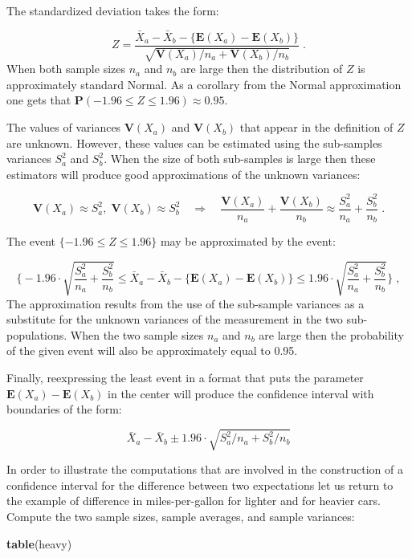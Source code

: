 \documentclass[
]{krantz}
\makeatletter
\newenvironment{Shaded}{\begin{snugshade}}{\end{snugshade}}
\newcommand{\KeywordTok}[1]{\textcolor[rgb]{0.13,0.29,0.53}{\textbf{#1}}}
\newcommand{\NormalTok}[1]{#1}
\newcommand{\Expec}{\mathbf{E}}
\newcommand{\Prob}{\mathbf{P}}
\newcommand{\Var}{\mathbf{V}}
\newenvironment{kframe}{%
\medskip{}
\setlength{\fboxsep}{.8em}
 \def\at@end@of@kframe{}%
 \ifinner\ifhmode%
  \def\at@end@of@kframe{\end{minipage}}%
  \begin{minipage}{\columnwidth}%
 \fi\fi%
 \def\FrameCommand##1{\hskip\@totalleftmargin \hskip-\fboxsep
 \colorbox{shadecolor}{##1}\hskip-\fboxsep
     \hskip-\linewidth \hskip-\@totalleftmargin \hskip\columnwidth}%
 \MakeFramed {\advance\hsize-\width
   \@totalleftmargin\z@ \linewidth\hsize
   \@setminipage}}%
 {\par\unskip\endMakeFramed%
 \at@end@of@kframe}
\renewenvironment{Shaded}{\begin{kframe}}{\end{kframe}}
\theoremstyle{definition}
\theoremstyle{definition}
\theoremstyle{definition}
\theoremstyle{remark}
\makeatother
\begin{document}
The standardized deviation takes the form:

\[Z = \frac{\bar X_a- \bar X_b - \{\Expec(X_a)- \Expec(X_b)\}}{\sqrt{\Var(X_a)/n_a +\Var(X_b)/n_b}}\;.\]
When both sample sizes \(n_a\) and \(n_b\) are large then the distribution
of \(Z\) is approximately standard Normal. As a corollary from the Normal
approximation one gets that
\(\Prob(-1.96 \leq Z \leq 1.96) \approx 0.95\).

The values of variances \(\Var(X_a)\) and \(\Var(X_b)\) that appear in the
definition of \(Z\) are unknown. However, these values can be estimated
using the sub-samples variances \(S_a^2\) and \(S_b^2\). When the size of
both sub-samples is large then these estimators will produce good
approximations of the unknown variances:

\[\Var(X_a) \approx S_a^2,\; \Var(X_b) \approx S_b^2\quad \Longrightarrow \quad\frac{\Var(X_a)}{n_a} + \frac{\Var(X_b)}{n_b} \approx  \frac{S_a^2}{n_a} + \frac{S_b^2}{n_b}\;.\]

The event \(\{-1.96 \leq Z \leq 1.96\}\) may be approximated by the event:

\[\Bigg\{-1.96 \cdot \sqrt{\frac{S_a^2}{n_a} + \frac{S_b^2}{n_b}} \leq \bar X_a- \bar X_b - \{\Expec(X_a)- \Expec(X_b)\} \leq 1.96 \cdot \sqrt{\frac{S_a^2}{n_a} + \frac{S_b^2}{n_b}}\Bigg\}\;,\]
The approximation results from the use of the sub-sample variances as a
substitute for the unknown variances of the measurement in the two
sub-populations. When the two sample sizes \(n_a\) and \(n_b\) are large
then the probability of the given event will also be approximately equal
to 0.95.

Finally, reexpressing the least event in a format that puts the
parameter \(\Expec(X_a)- \Expec(X_b)\) in the center will produce the
confidence interval with boundaries of the form:

\[\bar X_a- \bar X_b \pm 1.96 \cdot \sqrt{S_a^2/n_a + S_b^2/n_b}\]

In order to illustrate the computations that are involved in the
construction of a confidence interval for the difference between two
expectations let us return to the example of difference in
miles-per-gallon for lighter and for heavier cars. Compute the two
sample sizes, sample averages, and sample variances:

\begin{Shaded}
\begin{Highlighting}[]
\KeywordTok{table}\NormalTok{(heavy)}
\end{Highlighting}
\end{Shaded}
\end{document}
